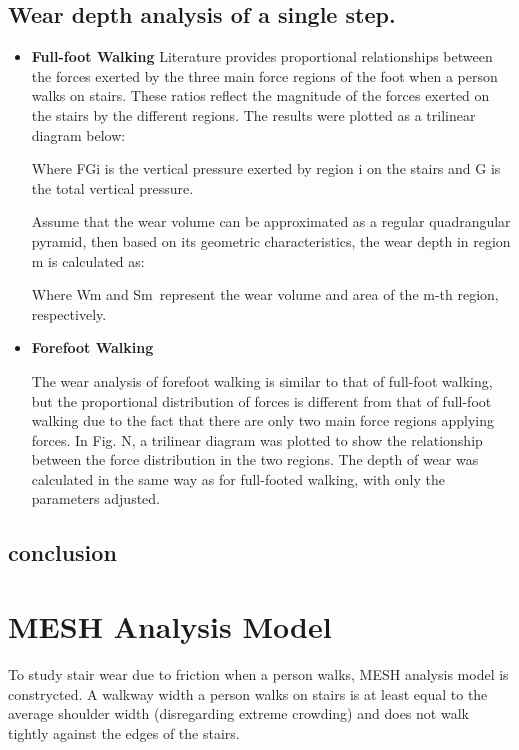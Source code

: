 \documentclass{mcmthesis}
\begin{document}
\subsection{Wear depth analysis of a single step.}
\begin{itemize}[label=$\diamond$]

  \item \textbf{Full-foot Walking}
Literature \cite{ WOS:000678697003082}provides proportional relationships between the forces exerted by the three main force regions of the foot when a person walks on stairs. These ratios reflect the magnitude of the forces exerted on the stairs by the different regions. The results were plotted as a trilinear diagram below:



Where FGi is the vertical pressure exerted by region i on the stairs and G is the total vertical pressure.


Assume that the wear volume can be approximated as a regular quadrangular pyramid, then based on its geometric characteristics, the wear depth in region m is calculated as:

Where Wm and Sm represent the wear volume and area of the m-th region, respectively.
\item \textbf{Forefoot Walking}

The wear analysis of forefoot walking is similar to that of full-foot walking, but the proportional distribution of forces is different from that of full-foot walking due to the fact that there are only two main force regions applying forces. In Fig. N, a trilinear diagram was plotted to show the relationship between the force distribution in the two regions. The depth of wear was calculated in the same way as for full-footed walking, with only the parameters adjusted.
\end{itemize}
\subsection{conclusion}

\section{MESH Analysis Model}
To study stair wear due to friction when a person walks, MESH analysis model is constrycted. A walkway width a person walks on stairs is at least equal to the average shoulder width (disregarding extreme crowding) and does not walk tightly against the edges of the stairs. 
\end{document}
